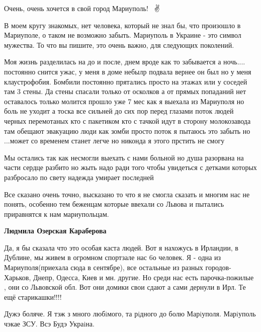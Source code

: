 
Очень, очень хочется в свой город Мариуполь!💖🙌🙏✌


В моем кругу знакомых, нет человека, который не знал бы, что произошло в
Мариуполе, о таком не возможно забыть. Мариуполь в Украине - это символ
мужества. То что вы пишите, это очень важно, для следующих поколений.


Моя жизнь разделилась на до и после, днем вроде как то забывается а ночь....
постоянно снится ужас, у меня в доме небылр подвала вернее он был но у меня
клаустрофобия. Бомбили постоянно прятались просто на этажах или у соседей там 3
стены. Да стены спасали только от осколков а от прямых попаданий нет оставалось
только молится прошло уже 7 мес как я выехала из Мариуполя но боль не уходит а
тоска все сильней до сих пор перед глазами поток людей черных перемотаных кто с
пакетиком кто с тачкой идут в сторону молокозавода там обещают эвакуацию люди
как зомби просто поток я пытаюсь это забыть но ...может со временем станет
легче но никонда я этого прстить не смогу


Мы остались так как несмогли выехать с нами больной но душа разорвана на части
сердце разбито но жыть надо ради того чтобы увидеться с детками которых
разбросало по свету надежда умирает последней


Все сказано очень точно, высказано то что я не смогла сказать и многим нас не
понять, особенно тем беженцам которые ввехали со Львова и пытались приравнятся
к нам мариупольцам.

\begin{itemize} %
\textbf{Людмила Озерская Караберова} 

Да, я бы сказала что это особая каста людей. Вот я нахожусь в Ирландии, в
Дублине, мы живем в огромном спортзале нас 6о человек. Я - одна из
Мариуполя(приехала сюда в сентябре), все остальные из разных
городов-Харьков, Днепр, Одесса, Киев и мн. другие. Но среди нас есть парочка-пожилые
, они со Львовской обл. Вот они домики свои сдают а сами дернули в Ирл. Те ещё
старикашки!!!!

\end{itemize} %


Дужэ боляче. Я тэж з много любiмого, та рiдного до болю Марiуполя. Марiуполь
чэкае ЗСУ. Всэ Будэ Украiна.

